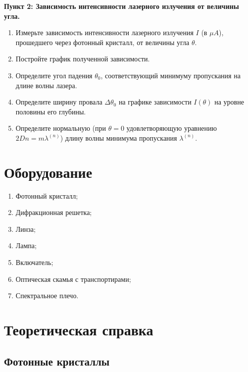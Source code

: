 \documentclass[a4paper, 12pt]{article}
\begin{document}
\textbf{Пункт 2: Зависимость интенсивности лазерного излучения от величины угла.}
	\begin{enumerate}
\item Измерьте зависимость интенсивности лазерного излучения $I$ (в $\mu A$), прошедшего через фотонный кристалл, от величины угла $\theta$.
\item Постройте график полученной зависимости.
\item Определите угол падения $\theta_0$, соответствующий минимуму пропускания на длине волны лазера.
\item Определите ширину провала $\Delta \theta_0$ на графике зависимости $I(\theta)$ на уровне половины его глубины.
\item Определите нормальную (при $\theta=0$ удовлетворяющую уравнению $2Dn=m\lambda^{(n)}$) длину волны минимума пропускания $\lambda^{(n)}$.
	\end{enumerate}

	\section{Оборудование}


\begin{enumerate}

	\item Фотонный кристалл;

	\item Дифракционная решетка;

	\item Линза;

	\item Лампа;

	\item Включатель;

	\item Оптическая скамья с транспортирами;

	\item Спектральное плечо.

\end{enumerate}

\section{Теоретическая справка}

\subsection{Фотонные кристаллы}
\end{document}
